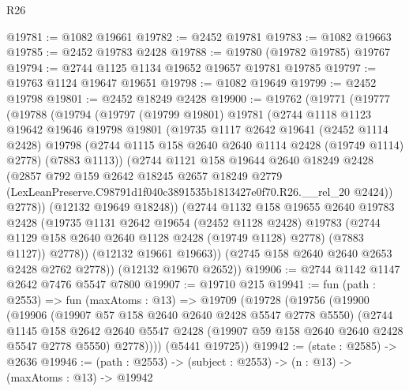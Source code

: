 \begin{lexlean}{R26}
\begin{coremodule}
@19781 := @1082 @19661
@19782 := @2452 @19781
@19783 := @1082 @19663
@19785 := @2452 @19783 @2428
@19788 := @19780 (@19782 @19785) @19767
@19794 := @2744 @1125 @1134 @19652 @19657 @19781 @19785
@19797 := @19763 @1124 @19647 @19651
@19798 := @1082 @19649
@19799 := @2452 @19798
@19801 := @2452 @18249 @2428
@19900 := @19762
    (@19771
      (@19777
        (@19788
          (@19794
            (@19797
              (@19799 @19801)
              @19781
              (@2744
                @1118
                @1123
                @19642
                @19646
                @19798
                @19801
                (@19735
                  @1117
                  @2642
                  @19641
                  (@2452 @1114 @2428)
                  @19798
                  (@2744 @1115 @158 @2640 @2640 @1114 @2428 (@19749 @1114) @2778)
                  (@7883 @1113))
                (@2744
                  @1121
                  @158
                  @19644
                  @2640
                  @18249
                  @2428
                  (@2857
                    @792
                    @159
                    @2642
                    @18245
                    @2657
                    @18249
                    @2779
                    (LexLeanPreserve.C98791d1f040c3891535b1813427e0f70.R26.__rel_20 @2424))
                  @2778))
              (@12132 @19649 @18248))
            (@2744
              @1132
              @158
              @19655
              @2640
              @19783
              @2428
              (@19735
                @1131
                @2642
                @19654
                (@2452 @1128 @2428)
                @19783
                (@2744 @1129 @158 @2640 @2640 @1128 @2428 (@19749 @1128) @2778)
                (@7883 @1127))
              @2778))
          (@12132 @19661 @19663))
        (@2745 @158 @2640 @2640 @2653 @2428 @2762 @2778))
      (@12132 @19670 @2652))
@19906 := @2744 @1142 @1147 @2642 @7476 @5547 @7800
@19907 := @19710 @215
@19941 := fun (path : @2553) =>
  fun (maxAtoms : @13) =>
  @19709
    (@19728
      (@19756
        (@19900
          (@19906
            (@19907 @57 @158 @2640 @2640 @2428 @5547 @2778 @5550)
            (@2744
              @1145
              @158
              @2642
              @2640
              @5547
              @2428
              (@19907 @59 @158 @2640 @2640 @2428 @5547 @2778 @5550)
              @2778))))
      (@5441 @19725))
@19942 := (state : @2585) -> @2636
@19946 := (path : @2553) -> (subject : @2553) -> (n : @13) -> (maxAtoms : @13) -> @19942

\end{coremodule}
\end{lexlean}
